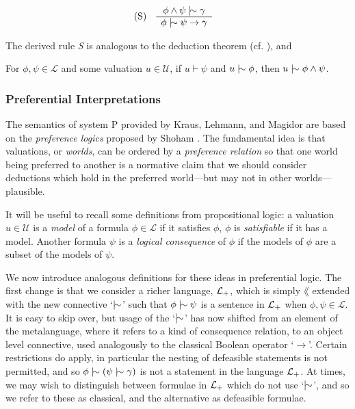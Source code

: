 \begin{align}
	\inferLeft{S}{\phi \land \psi \twiddle \gamma}{\phi \twiddle \psi \rightarrow \gamma}
\end{align}

The derived rule \textit{S} is analogous to the deduction theorem (cf. ), and

\begin{lemma}
	For $\phi, \psi \in \mathcal{L}$ and some valuation $u \in \mathcal{U}$, if $u \vdash \psi$ and $u \twiddle \phi$, then
	$u \twiddle \phi \land \psi$.
\end{lemma}

\subsubsection{Preferential Interpretations}
\label{subsubsection:preferential-interpretations}

The semantics of system P provided by Kraus, Lehmann, and Magidor \cite{kraus1990nonmonotonic} are based on the \textit{preference
logics} proposed by Shoham \cite{shohamSemanticApproach}. The fundamental idea is that valuations, or \textit{worlds},
can be ordered by a \textit{preference relation} so that one world being preferred to another is a normative claim that we
should consider deductions which hold in the preferred world---but may not in other worlds---plausible.

It will be useful to recall some definitions from propositional logic: a valuation $u \in \mathcal{U}$ is a \textit{model}
of a formula $\phi \in \mathcal{L}$ if it satisfies $\phi$, $\phi$ is \textit{satisfiable} if it has a model. Another
formula $\psi$ is a \textit{logical consequence} of $\phi$ if the models of $\phi$ are a subset of the models of $\psi$.

We now introduce analogous definitions for these ideas in preferential logic. The first change is that we consider a
richer language, $\mathcal{L}_+$, which is simply $\lang$ extended with the new connective `$\twiddle$' such that
$\phi \twiddle \psi$ is a sentence in $\mathcal{L}_+$ when $\phi, \psi \in \mathcal{L}$. It is easy to skip over, but usage of
the `$\twiddle$' has now shifted from an element of the metalanguage, where it refers to a kind of consequence relation,
to an object level connective, used analogously to the classical Boolean operator `$\rightarrow$'. Certain restrictions
do apply, in particular the nesting of defeasible statements is not permitted, and so
$\phi \twiddle (\psi \twiddle \gamma )$ is not a statement in the language $\mathcal{L}_+$. At times, we may wish to distinguish
between formulae in $\mathcal{L}_+$ which do not use `$\twiddle$', and so we refer to these as classical, and the alternative as
defeasible formulae.


